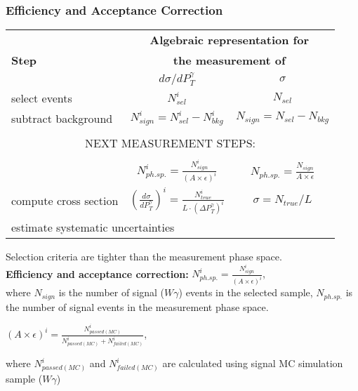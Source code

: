 \begin{frame}\frametitle{Efficiency and Acceptance Correction}

\begin{table}[h]
  \tiny
  \begin{center}
  \begin{tabular}{|l|c|c|}
    \hline
          & \multicolumn{2}{|c|}{{\bfseries{Algebraic representation for}}} \\ 
     {\bfseries{Step}} & \multicolumn{2}{|c|}{{\bfseries{the measurement of}}} \\ 
          & {\bfseries{$d\sigma/dP_{T}^{\gamma}$}} & {\bfseries{$\sigma$}} \\ \hline
    select events & {\bfseries{$N_{sel}^i$}} &    {\bfseries{$N_{sel}$}}       \\ \hline
    subtract background & {\bfseries{$N_{sign}^i = N_{sel}^i - N_{bkg}^i$}} &    {\bfseries{$N_{sign}=N_{sel}-N_{bkg}$}}       \\ \hline
    \multicolumn{3}{|c|}{ } \\  
    \multicolumn{3}{|c|}{NEXT MEASUREMENT STEPS:} \\  
    \multicolumn{3}{|c|}{ } \\ \hline 
    {\bfseries\color{blue}{correct for eff X acc}} & {\color{blue}$N_{ph.sp.}^i = \frac{N_{sign}^i}{(A \times\epsilon)^i}$} &  {\color{blue}$N_{ph.sp.}=\frac{N_{sign}}{A\times\epsilon}$}       \\ \hline
    compute cross section & $ \left( \frac{d\sigma}{dP_{T}^\gamma} \right) ^i = \frac{N_{true}^i}{L \cdot (\Delta P_T^\gamma)^i}$  &  $\sigma = N_{true}/L$       \\ \hline
    \multicolumn{3}{|l|}{estimate systematic uncertainties }         \\ \hline
  \end{tabular}
  \label{tab:analysisOutline}
  \end{center}
\end{table}

\scriptsize
Selection criteria are tighter than the measurement phase space. \\
\tiny
\vspace{3mm}
{\bfseries{Efficiency and acceptance correction:}} {\scriptsize{$N_{ph.sp.}^i = \frac{N_{sign}^i}{(A \times\epsilon)^i}$,}}\\
where $N_{sign}$ is the number of signal ($W\gamma$) events in the selected sample, $N_{ph.sp.}$ is the number of signal events in the measurement phase space.\\
\vspace{3mm}
\scriptsize
\begin{center}
$(A\times\epsilon)^i = \frac{N_{passed(MC)}^i}{N_{passed(MC)}^i+N_{failed(MC)}^i}$, \\
\end{center}
{\tiny where {$N_{passed(MC)}^i$ and $N_{failed(MC)}^i$ are calculated using signal MC simulation sample ($W\gamma$)}}\\

\end{frame}%

